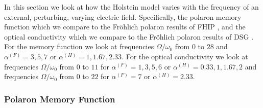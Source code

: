 In this section we look at how the Holstein model varies with the frequency of an external, perturbing, varying electric field. Specifically, the polaron memory function which we compare to the Fr\"ohlich polaron results of FHIP \cite{Feynman1962}, and the optical conductivity which we compare to the Fr\"ohlich polaron results of DSG \cite{Devreese1972}. For the memory function we look at frequencies $\Omega / \omega_0$ from $0$ to $28$ and $\alpha^{(F)} = 3, 5, 7$ or $\alpha^{(H)} = 1, 1.67, 2.33$. For the optical conductivity we look at frequencies $\Omega / \omega_0$ from $0$ to $11$ for $\alpha^{(F)} = 1, 3, 5, 6$ or $\alpha^{(H)} = 0.33, 1, 1.67, 2$ and frequencies $\Omega / \omega_0$ from $0$ to $22$ for $\alpha^{(F)} = 7$ or $\alpha^{(H)} = 2.33$. 

\subsubsection{Polaron Memory Function}

